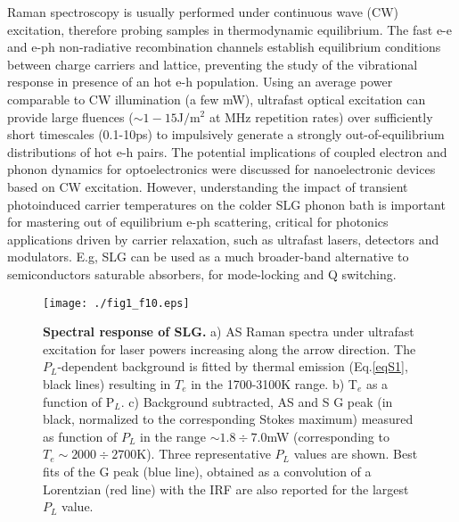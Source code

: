 \documentclass[aps, prl,twocolumn]{revtex4}
\begin{document}
Raman spectroscopy is usually performed under continuous wave (CW) excitation, therefore probing samples in thermodynamic equilibrium. The fast e-e and e-ph non-radiative recombination channels establish equilibrium conditions between charge carriers and lattice, preventing the study of the vibrational response in presence of an hot e-h population. Using an average power comparable to CW illumination (a few mW), ultrafast optical excitation can provide large fluences ($\sim1-15$J$/$m$^2$ at MHz repetition rates) over sufficiently short timescales (0.1-10ps) to impulsively generate a strongly out-of-equilibrium distributions of hot e-h pairs\cite{Lui2010, Yan2009, Breusing2011,Brida2013}. The potential implications of coupled electron and phonon dynamics for optoelectronics were discussed for nanoelectronic devices based on CW excitation\cite{Chae2010,PhysRevLett.104.227401, PhysRevB.93.075410, Mogulkoc201485, kim_bright_2015}. However, understanding the impact of transient photoinduced carrier temperatures on the colder SLG phonon bath is important for mastering out of equilibrium e-ph scattering, critical for photonics applications driven by carrier relaxation, such as ultrafast lasers\cite{sun2010}, detectors\cite{Bonaccorso2010, Koppens2014} and modulators\cite{Liu2011}. E.g, SLG can be used as a much broader-band alternative to semiconductors saturable absorbers\cite{sun2010}, for mode-locking and Q switching\cite{sun2010,Bonaccorso2010}.


\begin{figure*}
	\centerline{\texttt{[image: ./fig1\_f10.eps]}}
	\caption{\textbf{Spectral response of SLG.} a) AS Raman spectra under ultrafast excitation for laser powers increasing along the arrow direction. The $P_L$-dependent background is fitted by thermal emission (Eq.\ref{eqS1}, black lines) resulting in $T_e$ in the 1700-3100K range. b) T$_e$ as a function of P$_L$. c) Background subtracted, AS and S G peak (in black, normalized to the corresponding Stokes maximum) measured as function of $P_L$ in the range $\sim 1.8 \div 7.0$mW (corresponding to $T_e \sim 2000 \div 2700$K). Three representative $P_L$ values are shown. Best fits of the G peak (blue line), obtained as a convolution of a Lorentzian (red line) with the IRF are also reported for the largest $P_L$ value.}
	\label{fig1}
\end{figure*}
\end{document}
